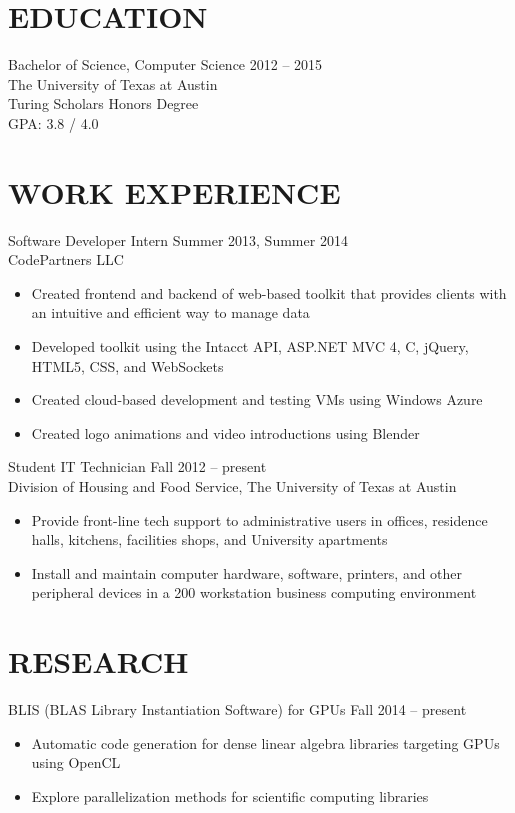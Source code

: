 \documentclass[margin]{res}
\newcommand{\PLUS}{\nolinebreak\hspace{-.05em}\raisebox{.4ex}{\tiny\bf+}}
\newcommand{\CS}{C\nolinebreak\hspace{-.05em}\raisebox{.4ex}{\scriptsize\bf \#}}
\begin{document}
\begin{resume}
 
\section{EDUCATION}
	Bachelor of Science, Computer Science \hfill 2012 -- 2015\\
	The University of Texas at Austin\\
	Turing Scholars Honors Degree\\
	GPA: 3.8 / 4.0

\section{WORK EXPERIENCE}
	Software Developer Intern \hfill Summer 2013, Summer 2014 \\
	CodePartners LLC
	\begin{itemize} \itemsep -1pt %
	\item Created frontend and backend of web-based toolkit that provides clients with an intuitive and efficient way to manage data
	\item Developed toolkit using the Intacct API, ASP.NET MVC 4, \CS{}, jQuery, HTML5, CSS, and WebSockets
	\item Created cloud-based development and testing VMs using Windows Azure
	\item Created logo animations and video introductions using Blender
	\end{itemize}
 
	Student IT Technician \hfill Fall 2012 -- present \\
	Division of Housing and Food Service, The University of Texas at Austin
	\begin{itemize} \itemsep -2pt %
	\item Provide front-line tech support to administrative users in offices, residence halls, kitchens, facilities shops, and University apartments
	\item Install and maintain computer hardware, software, printers, and other peripheral devices in a 200\PLUS{} workstation business computing environment
	\end{itemize}

\section{RESEARCH}
	BLIS (BLAS Library Instantiation Software) for GPUs \hfill Fall 2014 -- present
	\begin{itemize} \itemsep -2pt
	\item Automatic code generation for dense linear algebra libraries targeting GPUs using OpenCL
	\item Explore parallelization methods for scientific computing libraries
	\end{itemize}


\end{resume}
\end{document}
